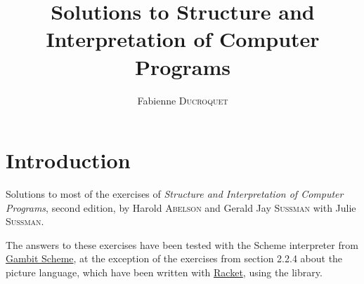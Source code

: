 \documentclass{scrreprt}
\title{Solutions to Structure and Interpretation of Computer Programs}
\author{Fabienne \textsc{Ducroquet}}
\theoremstyle{break}
\theoremstyle{example}
\theoremstyle{remark}
\theoremstyle{comp}
\begin{document}
\maketitle

\tableofcontents

\chapter*{Introduction}

Solutions to most of the exercises of \emph{Structure and Interpretation of 
Computer Programs}, second edition, by Harold \textsc{Abelson} and Gerald Jay 
\textsc{Sussman} with Julie \textsc{Sussman}.

The answers to these exercises have been tested with the Scheme interpreter from 
\href{http://gambitscheme.org}{Gambit Scheme}, at the exception of the exercises 
from section 2.2.4 about the picture language, which have been written with 
\href{http://racket-lang.org}{Racket}, using the  library.




\end{document}
